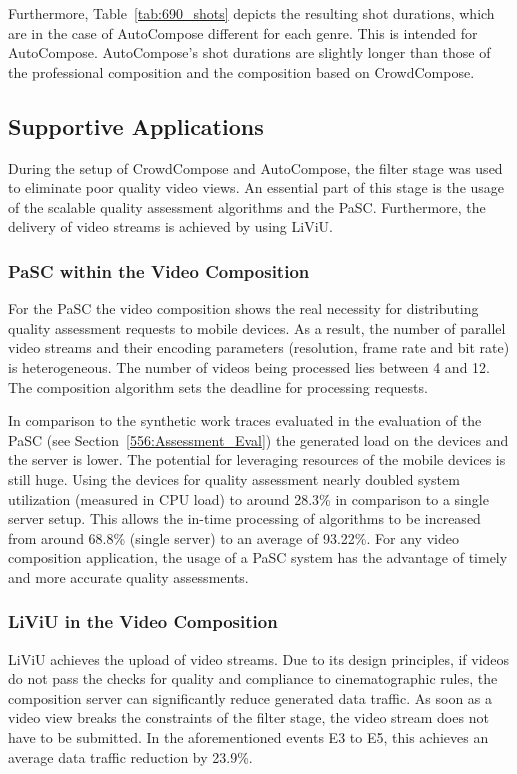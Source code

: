 Furthermore, Table~\ref{tab:690_shots} depicts the resulting shot durations, which are in the case of AutoCompose different for each genre.
This is intended for AutoCompose.
AutoCompose's shot durations are slightly longer than those of the professional composition and the composition based on CrowdCompose.                                                                                                                                                                                               
\subsection{Supportive Applications}
\label{sec:690_SupportiveApplications}
During the setup of CrowdCompose and AutoCompose, the filter stage was used to eliminate poor quality video views.
An essential part of this stage is the usage of the scalable quality assessment algorithms and the \ac{PaSC}.
Furthermore, the delivery of video streams is achieved by using \ac{LiViU}.
\subsubsection{PaSC within the Video Composition}
For the \ac{PaSC} the video composition shows the real necessity for distributing quality assessment requests to mobile devices.
As a result, the number of parallel video streams and their encoding parameters (resolution, frame rate and bit rate) is heterogeneous. 
The number of videos being processed lies between 4 and 12.
The composition algorithm sets the deadline for processing requests. 

In comparison to the synthetic work traces evaluated in the evaluation of the \ac{PaSC} (see Section~\ref{556:Assessment_Eval}) the generated load on the devices and the server is lower.
The potential for leveraging resources of the mobile devices is still huge. 
Using the devices for quality assessment nearly doubled system utilization (measured in CPU load)  to around 28.3\% in comparison to a single server setup.
This allows the in-time processing of algorithms to be increased from around 68.8\% (single server) to an average of 93.22\%.
For any video composition application, the usage of a \ac{PaSC} system has the advantage of timely and more accurate quality assessments.
\subsubsection{LiViU in the Video Composition}
LiViU achieves the upload of video streams.
 Due to its design principles, if videos do not pass the checks for quality and compliance to cinematographic rules, the composition server can significantly reduce generated data traffic. As soon as a video view breaks the constraints of the filter stage, the video stream does not have to be submitted. In the aforementioned events E3 to E5, this achieves an average data traffic reduction by 23.9\%.
 